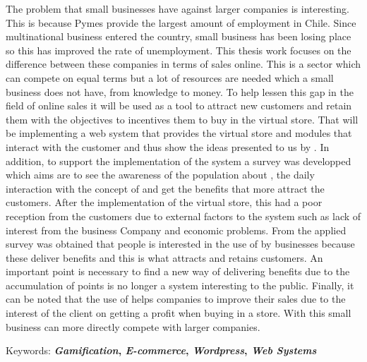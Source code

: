 The problem that small businesses have against larger companies is interesting. This is because Pymes  provide the largest amount of employment in Chile. Since multinational business entered the country, small business has been losing place so this has improved  the  rate of unemployment. This thesis  work focuses on the difference between these companies in terms of sales online. This is a sector which can compete on equal terms but a lot of resources are needed which  a small business does not have, from  knowledge to  money. To help lessen this gap in the field of online sales it will be used{\gam} as a tool to attract new customers and retain them with  the objectives to  incentives them to  buy  in the virtual store. That will be implementing a web system that provides the virtual store and modules that interact with the customer and thus show the ideas presented to us by {\gam}. 
In addition, to support the implementation of the system a survey was  developped  which aims are to see  the awareness of the population about {\gam}, the daily interaction with the concept of {\gam} and get the benefits that more  attract the  customers. 
After the implementation of the virtual store, this had a poor reception from the customers  due to external  factors  to the system such as lack of interest from the business Company  and economic problems. 
From the applied survey  was obtained that  people is  interested in the use  of {\gam} by businesses because these deliver benefits and this is what attracts and retains customers. 
An important point is necessary to find a new way of delivering benefits due to the accumulation of points is no longer a system interesting to the public. Finally, it can be noted that the use of {\gam} helps companies to improve their sales due to the interest of the client on  getting a  profit when buying in a store. With this small business  can more directly compete with larger companies.


Keywords: \textbf{\emph{Gamification}, \emph{E-commerce}, \emph{Wordpress}, \emph{Web Systems}}
